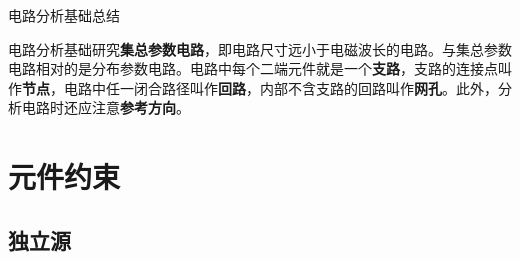 \documentclass[UTF8,fontset=fandol,zihao=5]{ctexart}
\begin{document}
\begin{center}
  {\heiti\headingfont{}\color{main} 电路分析基础总结}
\end{center}

\vspace{0.45em}

电路分析基础研究\textbf{集总参数电路}，即电路尺寸远小于电磁波长的电路。与集总参数电路相对的是分布参数电路。电路中每个二端元件就是一个\textbf{支路}，支路的连接点叫作\textbf{节点}，电路中任一闭合路径叫作\textbf{回路}，内部不含支路的回路叫作\textbf{网孔}。此外，分析电路时还应注意\textbf{参考方向}。

\section{元件约束}

\subsection{独立源}
\end{document}
